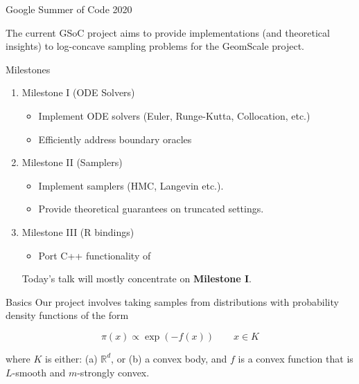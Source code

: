\documentclass[10pt]{beamer}
\begin{document}
\begin{frame}{Google Summer of Code 2020}

The current GSoC project aims to provide implementations (and theoretical insights) to log-concave sampling problems for the GeomScale project.

Milestones 

\begin{enumerate}
    \item Milestone I (ODE Solvers)
    \begin{itemize}
        \item Implement ODE solvers (Euler, Runge-Kutta, Collocation, etc.)
        \item Efficiently address boundary oracles
    \end{itemize}
    \item Milestone II (Samplers) 
    \begin{itemize}
        \item Implement samplers (HMC, Langevin etc.).  
        \item Provide theoretical guarantees on truncated settings. 
    \end{itemize}
    
    \item Milestone III (R bindings)
    \begin{itemize}
        \item Port C++ functionality of 
    \end{itemize}
    
    
    Today's talk will mostly concentrate on \textbf{Milestone I}.
    
\end{enumerate}


    
\end{frame}

\begin{frame}{Basics}
    Our project involves taking samples from distributions with probability density functions of the form
    
    $$\pi(x) \propto \exp(-f(x)) \qquad x \in K$$ 
    
    where $K$ is either: (a) $\mathbb R^d$, or (b) a convex body, and $f$ is a convex function that is $L$-smooth and $m$-strongly convex. 

\end{frame}
\end{document}
